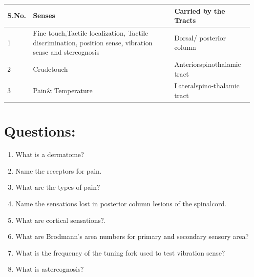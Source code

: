 \documentclass[a4paper,12pt,openany,twoside]{book}
\begin{document}
	\begin{table}[H]
\centering
		\begin{tabular}{|p{1in}|p{1.75in}|p{1.75in}|}
\hline
S.No. & \textbf{Senses}                                                                                       & \textbf{Carried by the Tracts}  \\
\hline
1     & Fine touch,Tactile localization, Tactile discrimination, position sense, vibration sense and stereognosis & Dorsal/ posterior column       \\
\hline
2     & Crudetouch                                                                                            & Anteriorspinothalamic tract    \\
\hline
3     & Pain\& Temperature                                                                                    & Lateralspino-thalamic tract    \\
\hline
\end{tabular}
\end{table}

\section*{Questions:}
\begin{enumerate}
		\itemsep0em
\item{What is a dermatome?}
\item{Name the receptors for pain.}
\item{What are the types of pain?}
\item{Name the sensations lost in posterior column lesions of the spinalcord.}
\item{What are cortical sensations?.}
\item{What are Brodmann’s area numbers for primary and secondary sensory area?}
\item{What is the frequency of the tuning fork used to test vibration sense?}
\item{What is astereognosis?}
\end{enumerate}
\end{document}
